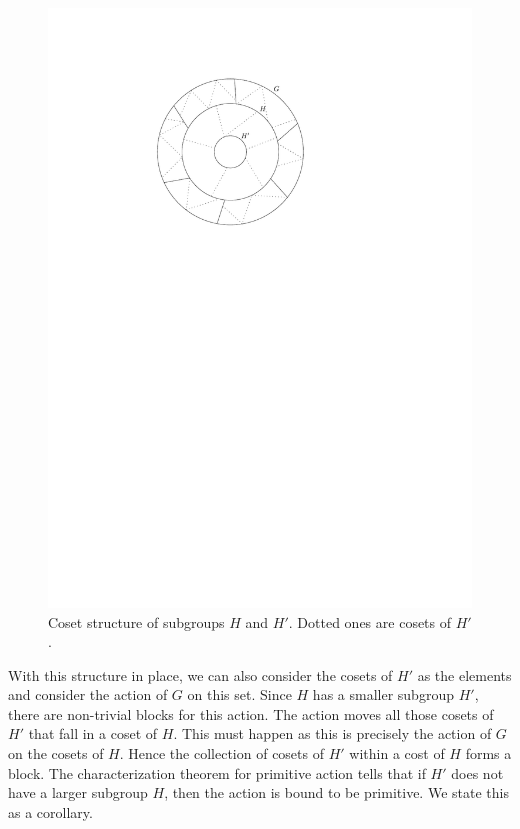 \begin{figure}[htp!]
	\centering
	\includegraphics[scale=0.7]{images/coset}
	\caption{Coset structure of subgroups $H$ and $H'$. Dotted ones are
	cosets of $H'$.}
	\label{fig:coset}
\end{figure}

With this structure in place, we can also consider the cosets of $H'$ 
as the elements and consider the action of $G$ on this set. Since $H$ has a
smaller subgroup $H'$, there are non-trivial blocks for this action. The
action moves all those cosets of $H'$ that fall in a coset of $H$. This must
happen as this is precisely the action of $G$ on the cosets of $H$.
Hence the collection of cosets of $H'$ within a cost of $H$ forms a block.
The characterization theorem for primitive action tells that if $H'$ does not
have a larger subgroup $H$, then the action is bound to be primitive. We state
this as a corollary.

